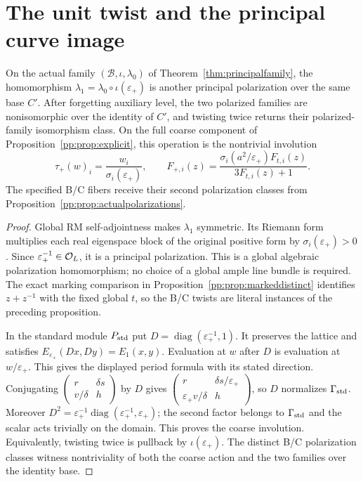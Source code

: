 \section{The unit twist and the principal curve image}
\begin{proposition}
\label{pp:prop:unitfamily}
On the actual family $(\mathcal B,\iota,\lambda_0)$ of
Theorem~\ref{thm:principalfamily}, the homomorphism
$\lambda_1=\lambda_0\circ\iota(\varepsilon_+)$ is another
principal polarization over the same base $C'$.
After forgetting auxiliary level, the two polarized families are
nonisomorphic over the identity of $C'$, and twisting twice returns
their polarized-family isomorphism class. On the full coarse
component of Proposition~\ref{pp:prop:explicit}, this operation is
the nontrivial involution
\[
 \tau_+(w)_i=\frac{w_i}{\sigma_i(\varepsilon_+)},\qquad
 F_{+,i}(z)=\frac{\sigma_i(a^2/\varepsilon_+)F_{t,i}(z)}
                         {3F_{t,i}(z)+1}.
\]
The specified B/C fibers receive their second polarization classes
from Proposition~\ref{pp:prop:actualpolarizations}.
\end{proposition}
\begin{proof}
Global RM self-adjointness makes $\lambda_1$ symmetric.
Its Riemann form multiplies each real eigenspace block of the
original positive form by $\sigma_i(\varepsilon_+)>0$.
Since $\varepsilon_+^{-1}\in\mathcal O_L$, it is a principal polarization.
This is a global algebraic polarization homomorphism; no choice
of a global ample line bundle is required. The exact marking
comparison in Proposition~\ref{pp:prop:markeddistinct} identifies
$z+z^{-1}$ with the fixed global $t$, so the B/C twists are literal
instances of the preceding proposition.

In the standard module $P_{\rm std}$ put
$D=\operatorname{diag}(\varepsilon_+^{-1},1)$.
It preserves the lattice and satisfies
$E_{\varepsilon_+}(Dx,Dy)=E_1(x,y)$.
Evaluation at $w$ after $D$ is evaluation at $w/\varepsilon_+$.
This gives the displayed period formula with its stated direction.
Conjugating $\left(\begin{smallmatrix}r&\delta s\\v/\delta&h\end{smallmatrix}\right)$
by $D$ gives
$\left(\begin{smallmatrix}r&\delta s/\varepsilon_+\\
\varepsilon_+v/\delta&h\end{smallmatrix}\right)$,
so $D$ normalizes $\Gamma_{\rm std}$. Moreover
$D^2=\varepsilon_+^{-1}\operatorname{diag}(\varepsilon_+^{-1},\varepsilon_+)$;
the second factor belongs to $\Gamma_{\rm std}$ and the scalar
acts trivially on the domain. This proves the coarse involution.
Equivalently, twisting twice is pullback by $\iota(\varepsilon_+)$.
The distinct B/C polarization classes witness nontriviality of
both the coarse action and the two families over the identity base.
\end{proof}

